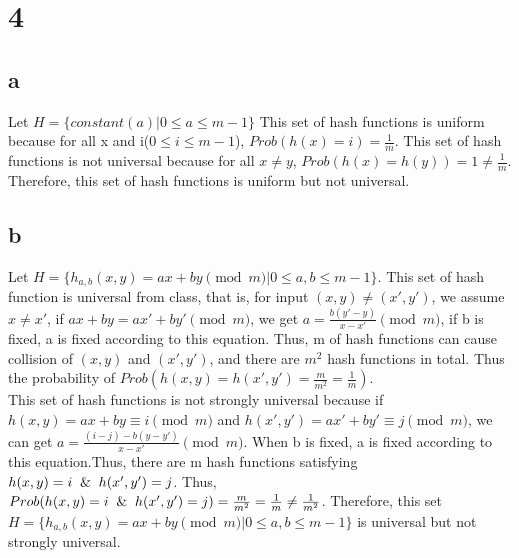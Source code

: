 \documentclass[
	12pt, %
]{fphw}
\begin{document}

\section*{4}




\subsection*{a}
Let $H=\{constant(a)| 0\leq a\leq m-1\}$ This set of hash functions is uniform because for all x and i($0\leq i \leq m-1$), $Prob(h(x)=i)=\frac{1}{m}$. This set of hash functions is not universal because for all $x\neq y$, $Prob(h(x)=h(y))=1\neq \frac{1}{m}$. Therefore, this set of hash functions is uniform but not universal.



\subsection*{b}
Let $H=\{h_{a,b}(x,y)=ax+by\pmod m|0\leq a,b \leq m-1\}$. This set of hash function is universal from class, that is, for input $(x,y)\neq (x',y')$,
 we assume $x\neq x'$, if $ax+by=ax'+by'\pmod m$, we get $a=\frac{b(y'-y)}{x-x'}\pmod m$, if b is fixed, a is fixed according to this equation. Thus, m of hash functions can cause collision of $(x,y)$ and $(x',y')$, and there are $m^2$ hash functions in total. Thus the probability of $Prob(h(x,y)=h(x',y')=\frac{m}{m^2}=\frac{1}{m})$.\\
 This set of hash functions is not strongly universal because if $h(x,y)=ax+by\equiv i\pmod m$ and $h(x',y')=ax'+by'\equiv j\pmod m$, we can get $a=\frac{(i-j)-b(y-y')}{x-x'}\pmod m$. When b is fixed, a is fixed according to this equation.Thus, there are m hash functions satisfying $h(x,y)=i\And h(x',y')=j$. Thus, $Prob(h(x,y)=i \And h(x',y')=j)=\frac{m}{m^2}=\frac{1}{m}\neq \frac{1}{m^2}$. Therefore, this set 
$H=\{h_{a,b}(x,y)=ax+by\pmod m|0\leq a,b \leq m-1\}$ is universal but not strongly universal.

\end{document}
